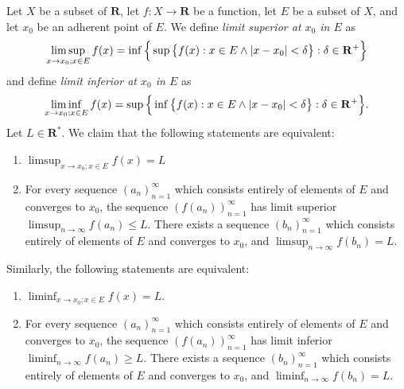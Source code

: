 \begin{additional corollary}\label{ac 9.3.1}
Let \(X\) be a subset of \(\mathbf{R}\), let \(f : X \to \mathbf{R}\) be a function, let \(E\) be a subset of \(X\), and let \(x_0\) be an adherent point of \(E\).
We define \emph{limit superior at \(x_0\) in \(E\)} as
\[
    \limsup_{x \to x_0 ; x \in E} f(x) = \inf\Big\{\sup\big\{f(x) : x \in E \land \abs*{x - x_0} < \delta\big\} : \delta \in \mathbf{R}^+\Big\}
\]
and define \emph{limit inferior at \(x_0\) in \(E\)} as
\[
    \liminf_{x \to x_0 ; x \in E} f(x) = \sup\Big\{\inf\big\{f(x) : x \in E \land \abs*{x - x_0} < \delta\big\} : \delta \in \mathbf{R}^+\Big\}.
\]
Let \(L \in \mathbf{R}^*\).
We claim that the following statements are equivalent:
\begin{enumerate}
    \item \(\limsup_{x \to x_0 ; x \in E} f(x) = L\)
    \item For every sequence \((a_n)_{n = 1}^\infty\) which consists entirely of elements of \(E\) and converges to \(x_0\), the sequence \((f(a_n))_{n = 1}^\infty\) has limit superior \(\limsup_{n \to \infty} f(a_n) \leq L\).
          There exists a sequence \((b_n)_{n = 1}^\infty\) which consists entirely of elements of \(E\) and converges to \(x_0\), and \(\limsup_{n \to \infty} f(b_n) = L\).
\end{enumerate}
Similarly, the following statements are equivalent:
\begin{enumerate}
    \item \(\liminf_{x \to x_0 ; x \in E} f(x) = L\).
    \item For every sequence \((a_n)_{n = 1}^\infty\) which consists entirely of elements of \(E\) and converges to \(x_0\), the sequence \((f(a_n))_{n = 1}^\infty\) has limit inferior \(\liminf_{n \to \infty} f(a_n) \geq L\).
          There exists a sequence \((b_n)_{n = 1}^\infty\) which consists entirely of elements of \(E\) and converges to \(x_0\), and \(\liminf_{n \to \infty} f(b_n) = L\).
\end{enumerate}
\end{additional corollary}


